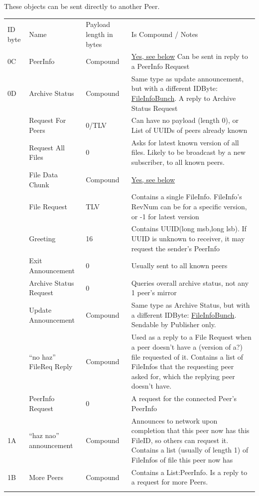 \documentclass[12pt,a4paper,]{adreport}
\begin{document}
These objects can be sent directly to another Peer.

\begin{longtable}[c]{@{}llll@{}}
\toprule\addlinespace
ID byte & Name & Payload length in bytes & Is Compound / Notes
\\\addlinespace
\midrule\endhead
0C & PeerInfo & Compound & \hyperref[PeerInfo]{Yes, see below} Can be
sent in reply to a PeerInfo Request
\\\addlinespace
0D & Archive Status & Compound & Same type as update announcement, but
with a different IDByte: \hyperref[FileInfoBunch]{FileInfoBunch}. A
reply to Archive Status Request
\\\addlinespace
10 & Request For Peers & 0/TLV & Can have no payload (length 0), or List
of UUIDs of peers already known
\\\addlinespace
11 & Request All Files & 0 & Asks for latest known version of all files.
Likely to be broadcast by a new subscriber, to all known peers.
\\\addlinespace
12 & File Data Chunk & Compound & \hyperref[FileDataChunk]{Yes, see
below}
\\\addlinespace
13 & File Request & TLV & Contains a single FileInfo. FileInfo's RevNum
can be for a specific version, or -1 for latest version
\\\addlinespace
14 & Greeting & 16 & Contains UUID(long msb,long lsb). If UUID is
unknown to receiver, it may request the sender's PeerInfo
\\\addlinespace
15 & Exit Announcement & 0 & Usually sent to all known peers
\\\addlinespace
16 & Archive Status Request & 0 & Queries overall archive status, not
any 1 peer's mirror
\\\addlinespace
17 & Update Announcement & Compound & Same type as Archive Status, but
with a different IDByte: \hyperref[FileInfoBunch]{FileInfoBunch}.
Sendable by Publisher only.
\\\addlinespace
18 & ``no haz'' FileReq Reply & Compound & Used as a reply to a File
Request when a peer doesn't have a (version of a?) file requested of it.
Contains a list of FileInfos that the requesting peer asked for, which
the replying peer doesn't have.
\\\addlinespace
19 & PeerInfo Request & 0 & A request for the connected Peer's PeerInfo
\\\addlinespace
1A & ``haz nao'' announcement & Compound & Announces to network upon
completion that this peer now has this FileID, so others can request it.
Contains a list (usually of length 1) of FileInfos of file this peer now
has
\\\addlinespace
1B & More Peers & Compound & Contains a List:PeerInfo. Is a reply to a
request for more Peers.
\\\addlinespace
\bottomrule
\end{longtable}
\end{document}
